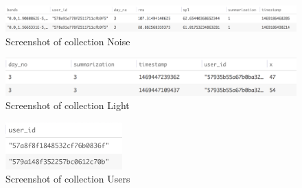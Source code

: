 \begin{figure}[ht!]
\centering
\includegraphics[width=\textwidth,keepaspectratio]{./images/collection_noise}
\caption{Screenshot of collection Noise}
\label{fig:col_noise}
\end{figure}

\begin{figure}[ht!]
\centering
\includegraphics[width=\textwidth,keepaspectratio]{./images/collection_light}
\caption{Screenshot of collection Light}
\label{fig:col_light}
\end{figure}

\begin{figure}[ht!]
\centering
\includegraphics[width=0.4\textwidth,keepaspectratio]{./images/collection_users}
\caption{Screenshot of collection Users}
\label{fig:col_users}
\end{figure}

